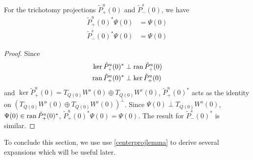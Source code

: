 \documentclass[thesis.tex]{subfiles}
\begin{document}
\begin{lemma}\label{lemma:trichadjoint}
For the trichotomy projections $\tilde{P}_+^u(0)$ and $\tilde{P}_-^s(0)$, we have
\begin{equation}
\begin{aligned}
\tilde{P}_+^u(0)^* \Psi(0) &= \Psi(0) \\
\tilde{P}_-^s(0)^* \Psi(0) &= \Psi(0)
\end{aligned}
\end{equation}
\begin{proof}
Since
\begin{align*}
\mathop\mathrm{ker}\nolimits \tilde{P}_+^u(0)^* &\perp \operatorname{ran} \tilde{P}_+^u(0) \\
\operatorname{ran} \tilde{P}_+^u(0)^* &\perp \mathop\mathrm{ker}\nolimits \tilde{P}_+^u(0)
\end{align*}
and $\ker \tilde{P}_+^u(0) = T_{Q(0)} W^s(0) \oplus T_{Q(0)} W^c(0)$, $\tilde{P}_+^u(0)^*$ acts as the identity on $(T_{Q(0)} W^s(0) \oplus T_{Q(0)} W^c(0))^\perp$. Since $\Psi(0) \perp T_{Q(0)} W^s(0)$, $\Psi(0) \in \operatorname{ran} \tilde{P}_+^u(0)^*$, $\tilde{P}_+^u(0)^* \Psi(0) = \Psi(0)$. The result for $\tilde{P}_-^s(0)^*$ is similar.
\end{proof}
\end{lemma}

To conclude this section, we use use \cref{centerprojlemma} to derive several expansions which will be useful later.
\end{document}
